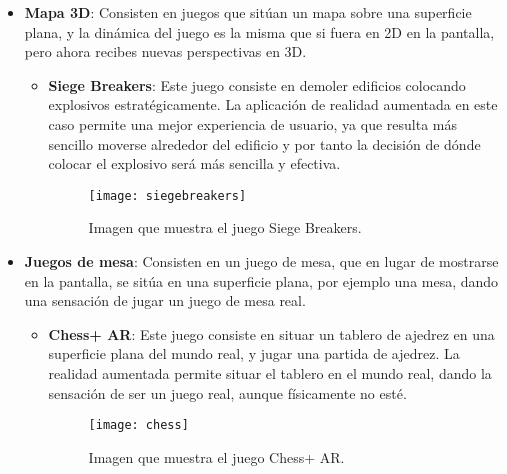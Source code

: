 \begin{itemize}
  \item \textbf{Mapa 3D}: Consisten en juegos que sitúan un mapa sobre una superficie plana, y la dinámica del juego es la misma que si fuera en 2D en la pantalla, pero ahora recibes nuevas perspectivas en 3D.

  \begin{itemize}
    \item \textbf{Siege Breakers}: Este juego consiste en demoler edificios colocando explosivos estratégicamente. La aplicación de realidad aumentada en este caso permite una mejor experiencia de usuario, ya que resulta más sencillo moverse alrededor del edificio y por tanto la decisión de dónde colocar el explosivo será más sencilla y efectiva.

    \begin{figure}[h]
      \centering
      \texttt{[image: siegebreakers]}
      \caption{Imagen que muestra el juego Siege Breakers.\protect\footnotemark}
      \label{figura-siege-breakers}
    \end{figure}

  \end{itemize}

  \newpage

  \item \textbf{Juegos de mesa}: Consisten en un juego de mesa, que en lugar de mostrarse en la pantalla, se sitúa en una superficie plana, por ejemplo una mesa, dando una sensación de jugar un juego de mesa real.

  \begin{itemize}
    \item \textbf{Chess+ AR}: Este juego consiste en situar un tablero de ajedrez en una superficie plana del mundo real, y jugar una partida de ajedrez. La realidad aumentada permite situar el tablero en el mundo real, dando la sensación de ser un juego real, aunque físicamente no esté.

    \begin{figure}[h]
      \centering
      \texttt{[image: chess]}
      \caption{Imagen que muestra el juego Chess+ AR.\protect\footnotemark}
      \label{figura-siege-breakers}
    \end{figure}

  \end{itemize}


\end{itemize}
